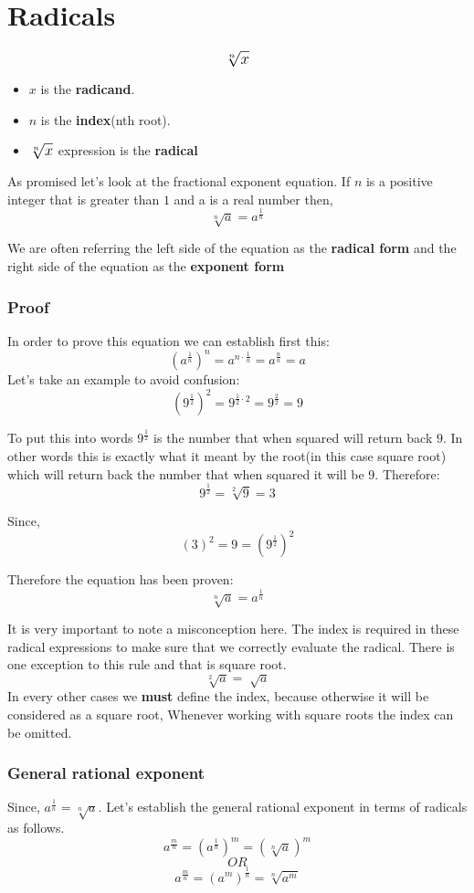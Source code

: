 \label{sec:radicals}
\section{Radicals}
$$ \large \sqrt[n]{x} $$
\begin{itemize}
  \item $x$ is the \textbf{radicand}.
  \item $n$ is the \textbf{index}(nth root).
  \item $\large \sqrt[n]{x}$ expression is the \textbf{radical}
\end{itemize}

As promised let's look at the fractional exponent equation. If $n$ is a positive integer that is greater than $1$ and a is a real number then,
$$ \sqrt[n]{a} = a^{\frac{1}{n}} $$

We are often referring the left side of the equation as the \textbf{radical form} and the right side of the equation as the \textbf{exponent form}

\subsubsection{Proof}
In order to prove this equation we can establish first this: 
$$ (a^{\frac{1}{n}})^{n} = a^{n \cdot \frac{1}{n}} = a^{\frac{n}{n}} = a $$
Let's take an example to avoid confusion: 
$$ (9^{\frac{1}{2}})^2 = 9^{\frac{1}{2} \cdot2} = 9^{\frac{2}{2}} = 9 $$

To put this into words $ 9^{\frac{1}{2}} $ is the number that when squared will return back $ 9 $. In other words this is exactly what it meant by the root(in this case square root) which will return back the number that when squared it will be 9. Therefore: 
$$ 9^{\frac{1}{2}} =  \sqrt[2]{9} = 3 $$

Since,
$$ (3)^2 = 9 = (9^{\frac{1}{2}})^2 $$

Therefore the equation has been proven: 
$$ \sqrt[n]{a} = a^{\frac{1}{n}} $$

It is very important to note a misconception here. The index is required in these radical expressions to make sure that we correctly evaluate the radical. There is one exception to this rule and that is square root.
$$ \sqrt[2]{a} = \sqrt[]{a} $$
In every other cases we \textbf{must} define the index, because otherwise it will be considered as a square root, Whenever working with square roots the index can be omitted.

\subsubsection{General rational exponent}
Since, $ a^{\frac{1}{n}} = \sqrt[n]{a} $.
Let's establish the general rational exponent in terms of radicals as follows. 
$$ a^{\frac{m}{n}} = (a^{\frac{1}{n}}) ^{m} = (\sqrt[n]{a})^m $$
$$ OR $$
$$ a^{\frac{m}{n}} = (a^m) ^{\frac{1}{n}} = \sqrt[n]{a^m} $$

